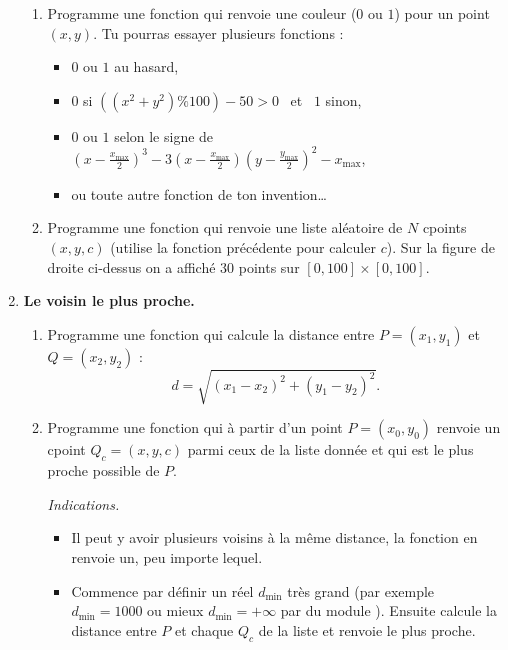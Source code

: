 \documentclass[10pt,class=report,crop=false]{standalone}
\begin{document}
\begin{activite}
\begin{enumerate}
\begin{enumerate}
		\item Programme une fonction  qui renvoie une couleur ($0$ ou $1$) pour un point $(x,y)$.
		Tu pourras essayer plusieurs fonctions :
		\begin{itemize}
			\item $0$ ou $1$ au hasard,
			\item $0$ si $((x^2+y^2)\% 100)  - 50>0$ \  et \  $1$ sinon,
			\item $0$ ou $1$ selon le signe de $\left(x-\frac{x_{\max}}{2}\right)^3 - 3 \left(x-\frac{x_{\max}}{2}\right)\left(y-\frac{y_{\max}}{2}\right)^2 - x_{\max}$,
			\item ou toute autre fonction de ton invention\ldots
		\end{itemize} 
		
		\item Programme une fonction  qui renvoie une liste aléatoire de $N$ cpoints $(x,y,c)$ (utilise la fonction précédente pour calculer $c$).
		Sur la figure de droite ci-dessus on a affiché $30$ points sur $[0,100]\times [0,100]$.
		
	\end{enumerate}
	
	\item \textbf{Le voisin le plus proche.}
	\begin{enumerate}
		\item Programme une fonction  qui calcule la distance entre $P = (x_1,y_1)$ et $Q=(x_2,y_2)$ :
		$$d = \sqrt{(x_1-x_2)^2 + (y_1-y_2)^2}.$$
		
		\item Programme une fonction 
		qui à partir d'un point $P=(x_0,y_0)$ renvoie un cpoint $Q_c = (x,y,c)$ parmi ceux de la liste donnée  et qui est le plus proche possible de $P$.
		
		\emph{Indications.}
		\begin{itemize}
			\item Il peut y avoir plusieurs voisins à la même distance, la fonction en renvoie un, peu importe lequel.
			
			\item Commence par définir un réel $d_{\min}$ très grand (par exemple $d_{\min} = 1000$ ou mieux $d_{\min} = + \infty$ par  du module ). Ensuite calcule la distance entre $P$ et chaque $Q_c$ de la liste et renvoie le plus proche.

		\end{itemize}
	

\end{enumerate}
\end{enumerate}
\end{activite}
\end{document}

